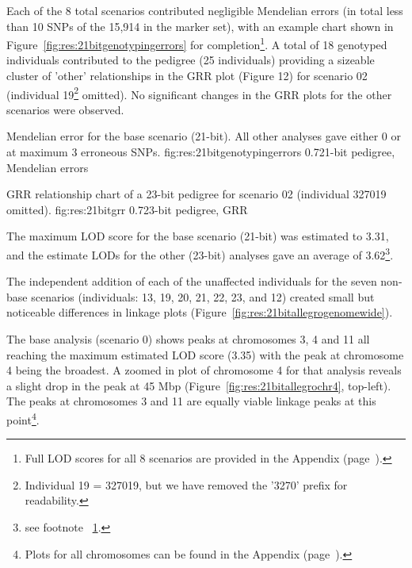 Each of the 8 total scenarios contributed negligible Mendelian errors (in total less than 10 SNPs of the 15,914 in the marker set), with an example chart shown in Figure~\ref{fig:res:21bitgenotypingerrors} for completion\footnote{\label{footnote:scores}Full LOD scores for all 8 scenarios are provided in the Appendix (page~\pageref{ref:app:21bitscores}).}. A total of 18 genotyped individuals contributed to the pedigree (25 individuals) providing a sizeable cluster of 'other' relationships in the GRR plot (Figure 12) for scenario 02 (individual 19\footnote{Individual 19 = 327019, but we have removed the '3270' prefix for readability.} omitted). No significant changes in the GRR plots for the other scenarios were observed.

	{Mendelian error for the base scenario (21-bit). All other analyses gave either 0 or at maximum 3 erroneous SNPs.}
	{fig:res:21bitgenotypingerrors}
	{0.7}{21-bit pedigree, Mendelian errors}

	{GRR relationship chart of a 23-bit pedigree for scenario 02 (individual 327019 omitted).}
	{fig:res:21bitgrr}
	{0.7}{23-bit pedigree, GRR}

The maximum LOD score for the base scenario (21-bit) was estimated to 3.31, and the estimate LODs for the other (23-bit) analyses gave an average of 3.62\footnote{see footnote ~\ref{footnote:scores}.}. 

The independent addition of each of the unaffected individuals for the seven non-base scenarios (individuals: 13, 19, 20, 21, 22, 23, and 12) created small but noticeable differences in linkage plots (Figure~\ref{fig:res:21bitallegrogenomewide}). 

The base analysis (scenario 0) shows peaks at chromosomes 3, 4 and 11 all reaching the maximum estimated LOD score (3.35) with the peak at chromosome 4 being the broadest. A zoomed in plot of chromosome 4 for that analysis reveals a slight drop in the peak at 45 Mbp (Figure~\ref{fig:res:21bitallegrochr4}, top-left). The peaks at chromosomes 3 and 11 are equally viable linkage peaks at this point\footnote{Plots for all chromosomes can be found in the Appendix (page~\pageref{ref:app:21bitplots}).}.

